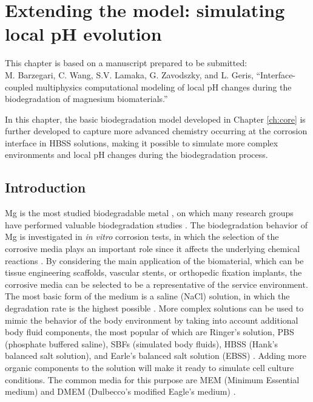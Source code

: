 \chapter{Extending the model: simulating local pH evolution}\label{ch:kinetics}


\begin{shaded}
This chapter is based on a manuscript prepared to be submitted:\\
M. Barzegari, C. Wang, S.V. Lamaka, G. Zavodszky, and L. Geris, ``Interface-coupled multiphysics computational modeling of local pH changes during the biodegradation of magnesium biomaterials.''
\end{shaded}

In this chapter, the basic biodegradation model developed in Chapter \ref{ch:core} is further developed to capture more advanced chemistry occurring at the corrosion interface in HBSS solutions, making it possible to simulate more complex environments and local pH changes during the biodegradation process.

\section{Introduction}

Mg is the most studied biodegradable metal \cite{Liu2019,Zheng2014,Chen2014,Zhang2013}, on which many research groups have performed valuable biodegradation studies \cite{Esmaily2017,Li2016,Atrens2020,Kirkland2012}. The biodegradation behavior of Mg is investigated in \textit{in vitro} corrosion tests, in which the selection of the corrosive media plays an important role since it affects the underlying chemical reactions \cite{Mei2020}. By considering the main application of the biomaterial, which can be tissue engineering scaffolds, vascular stents, or orthopedic fixation implants, the corrosive media can be selected to be a representative of the service environment. The most basic form of the medium is a saline (NaCl) solution, in which the degradation rate is the highest possible \cite{Mei2020}. More complex solutions can be used to mimic the behavior of the body environment by taking into account additional body fluid components, the most popular of which are Ringer's solution, \gls{PBS} (phosphate buffered saline), \gls{SBF}s (simulated body fluids), \gls{HBSS} (Hank's balanced salt solution), and Earle's balanced salt solution (\gls{EBSS}) \cite{Mei2020}. Adding more organic components to the solution will make it ready to simulate cell culture conditions. The common media for this purpose are \gls{MEM} (Minimum Essential medium) and \gls{DMEM} (Dulbecco's modified Eagle's medium) \cite{Mei2020}.

